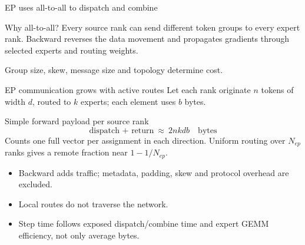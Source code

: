 \documentclass[handout]{beamer}
\begin{document}
\begin{frame}{EP uses all-to-all to dispatch and combine}
  \begin{center}
  \end{center}
  \begin{block}{Why all-to-all?}
    Every source rank can send different token groups to every expert rank. Backward reverses the data movement and propagates gradients through selected experts and routing weights.
  \end{block}
  \small Group size, skew, message size and topology determine cost.
\end{frame}

\begin{frame}{EP communication grows with active routes}
  \small Let each rank originate $n$ tokens of width $d$, routed to $k$ experts; each element uses $b$ bytes.
  \begin{block}{Simple forward payload per source rank}
    \[
      \text{dispatch + return}\ \approx\ 2n k d b\quad\text{bytes}
    \]
    Counts one full vector per assignment in each direction. Uniform routing over $N_{ep}$ ranks gives a remote fraction near $1-1/N_{ep}$.
  \end{block}
  \begin{itemize}
    \item Backward adds traffic; metadata, padding, skew and protocol overhead are excluded.
    \item Local routes do not traverse the network.
    \item Step time follows exposed dispatch/combine time and expert GEMM efficiency, not only average bytes.
  \end{itemize}
\end{frame}
\end{document}

